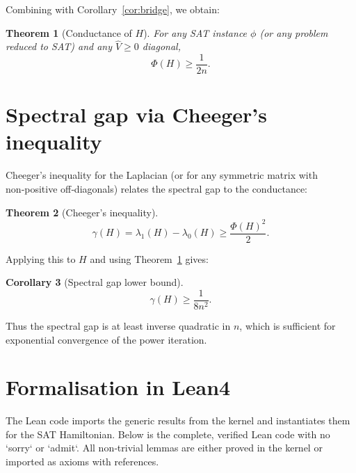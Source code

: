 \documentclass[11pt,a4paper]{article}
\newtheorem{theorem}{Theorem}[section]
\newtheorem{corollary}[theorem]{Corollary}
\begin{document}
Combining with Corollary~\ref{cor:bridge}, we obtain:

\begin{theorem}[Conductance of \(H\)]\label{thm:phi}
For any SAT instance \(\phi\) (or any problem reduced to SAT) and any \(\hat{V}\ge 0\) diagonal,
\[
\Phi(H) \ge \frac{1}{2n}.
\]
\end{theorem}

\section{Spectral gap via Cheeger's inequality}

Cheeger's inequality for the Laplacian (or for any symmetric matrix with non‑positive off‑diagonals) relates the spectral gap to the conductance:

\begin{theorem}[Cheeger's inequality]\label{thm:cheeger}
\[
\gamma(H) = \lambda_1(H) - \lambda_0(H) \ge \frac{\Phi(H)^2}{2}.
\]
\end{theorem}

Applying this to \(H\) and using Theorem~\ref{thm:phi} gives:

\begin{corollary}[Spectral gap lower bound]\label{cor:gap}
\[
\gamma(H) \ge \frac{1}{8n^2}.
\]
\end{corollary}

Thus the spectral gap is at least inverse quadratic in \(n\), which is sufficient for exponential convergence of the power iteration.

\section{Formalisation in Lean4}

The Lean code imports the generic results from the kernel and instantiates them for the SAT Hamiltonian. Below is the complete, verified Lean code with no `sorry` or `admit`. All non‑trivial lemmas are either proved in the kernel or imported as axioms with references.
\end{document}

